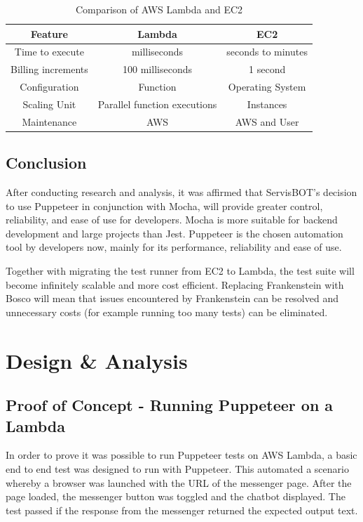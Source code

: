 \documentclass[12pt,a4paper,titlepage]{report}
\begin{document}
\begin{table}[ht]
  \centering
  \small
  \setlength\tabcolsep{6pt}
  \begin{tabular}{|c|c|c|}
   \hline
   \textbf{Feature} & \textbf{Lambda} & \textbf{EC2}\\
   \hline\hline
   Time to execute&milliseconds&seconds to minutes\\
   \hline
   Billing increments& 100 milliseconds&1 second\\
   \hline
   Configuration&Function& Operating System\\
   \hline
   Scaling Unit&Parallel function executions&Instances\\
   \hline
   Maintenance& AWS&AWS and User\\
   \hline
  \end{tabular}
  \caption{Comparison of AWS Lambda and EC2 \autocite{inbook}}
 \end{table}

\section{Conclusion}
After conducting research and analysis, it was affirmed that ServisBOT's decision to use Puppeteer in conjunction 
with Mocha, will provide greater control, reliability, and ease of use for developers. Mocha is more suitable for backend development and large projects than Jest. 
Puppeteer is the chosen automation tool by developers now, mainly for its performance, reliability and ease of use.

Together with migrating the test runner from EC2 to Lambda, the test suite will become infinitely scalable and 
more cost efficient. Replacing Frankenstein with Bosco will mean that issues encountered by Frankenstein can be resolved and unnecessary costs (for 
example running too many tests) can be eliminated.

\chapter{Design \& Analysis}

\section{Proof of Concept - Running Puppeteer on a Lambda}

In order to prove it was possible to run Puppeteer tests on AWS Lambda, a basic end to end test was designed
to run with Puppeteer. This automated a scenario whereby a browser was launched with the URL of the
messenger page. After the page loaded, the messenger button was toggled and the chatbot displayed. The test
passed if the response from the messenger returned the expected output text.
\end{document}
